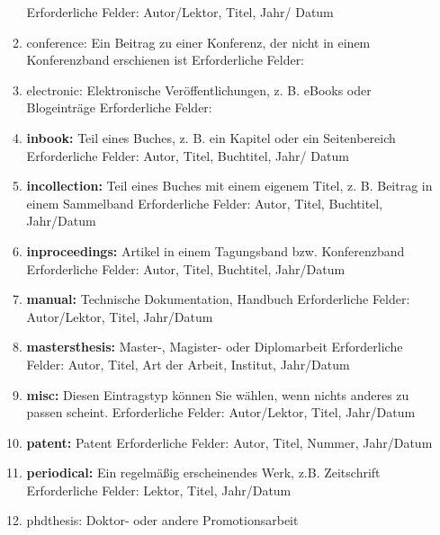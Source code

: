 \documentclass[b5paper,11pt,twoside]{scrbook} %
\begin{document}
\begin{enumerate}
\begin{enumerate}
        Erforderliche Felder: Autor/Lektor, Titel, Jahr/ Datum
        \item conference: Ein Beitrag zu einer Konferenz, der nicht in einem Konferenzband erschienen ist\newline
        Erforderliche Felder:
        \item electronic: Elektronische Veröffentlichungen, z. B. eBooks oder Blogeinträge\newline 
        Erforderliche Felder:
        \item \textbf{inbook:} Teil eines Buches, z. B. ein Kapitel oder ein Seitenbereich\newline
        Erforderliche Felder: Autor, Titel, Buchtitel, Jahr/ Datum 
        \item \textbf{incollection:} Teil eines Buches mit einem eigenem Titel, z. B. Beitrag in einem Sammelband\newline
        Erforderliche Felder: Autor, Titel, Buchtitel, Jahr/Datum
        \item \textbf{inproceedings:} Artikel in einem Tagungsband bzw. Konferenzband\newline
        Erforderliche Felder: Autor, Titel, Buchtitel, Jahr/Datum
        \item \textbf{manual:} Technische Dokumentation, Handbuch\newline
        Erforderliche Felder: Autor/Lektor, Titel, Jahr/Datum
        \item \textbf{mastersthesis:} Master-, Magister- oder Diplomarbeit\newline
        Erforderliche Felder: Autor, Titel, Art der Arbeit, Institut, Jahr/Datum
        \item \textbf{misc:} Diesen Eintragstyp können Sie wählen, wenn nichts anderes zu passen scheint. \newline
        Erforderliche Felder: Autor/Lektor, Titel, Jahr/Datum
        \item \textbf{patent:} Patent\newline 
        Erforderliche Felder: Autor, Titel, Nummer, Jahr/Datum
        \item \textbf{periodical:} Ein regelmäßig erscheinendes Werk, z.B. Zeitschrift\newline
        Erforderliche Felder: Lektor, Titel, Jahr/Datum
        \item phdthesis: Doktor- oder andere Promotionsarbeit\newline 

\end{enumerate}
\end{enumerate}
\end{document}
